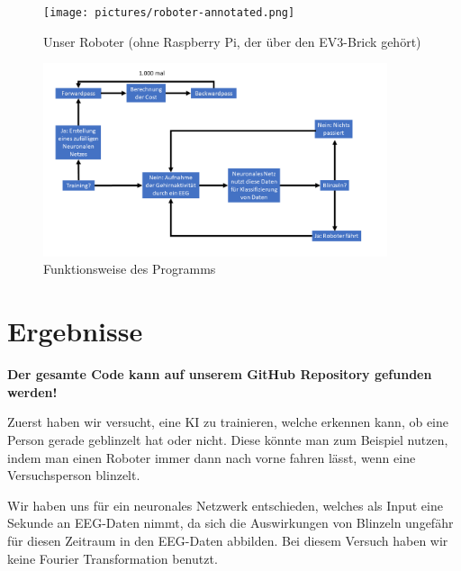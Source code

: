 \documentclass{scrartcl}
\begin{document}
	\begin{figure}[H]
		\centering
		\texttt{[image: pictures/roboter-annotated.png]}
		\caption{Unser Roboter (ohne Raspberry Pi, der über den EV3-Brick gehört)}
		\label{Robot}
	\end{figure}


	\begin{figure}[h!]
		\centering
		\includegraphics[width=0.9\textwidth]{pictures/Abbildung-des-Programms.png}
		\caption{Funktionsweise des Programms}
		\label{Gesamtfunktion}
	\end{figure}



	\section{Ergebnisse}

	{\textbf{Der gesamte Code kann auf unserem GitHub Repository gefunden werden! \cite{InterpretingEEG}} }

	Zuerst haben wir versucht, eine KI zu trainieren, welche erkennen kann, ob eine Person gerade geblinzelt hat oder nicht. Diese könnte man zum Beispiel nutzen, indem man einen Roboter immer dann nach vorne fahren lässt, wenn eine Versuchsperson blinzelt.

	Wir haben uns für ein neuronales Netzwerk entschieden, welches als Input eine Sekunde an EEG-Daten nimmt, da sich die Auswirkungen von Blinzeln ungefähr für diesen Zeitraum in den EEG-Daten abbilden. Bei diesem Versuch haben wir keine Fourier Transformation benutzt.
\end{document}
